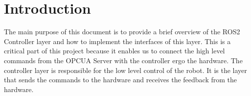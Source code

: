 \section{Introduction}

The main purpose of this document is to provide a brief overview of the ROS2 Controller layer and how to implement the interfaces of this layer.
This is a critical part of this project because it enables us to connect the high level commands from the OPCUA Server with the controller ergo the 
hardware. The controller layer is responsible for the low level control of the robot. It is the layer that sends the commands to the hardware and receives the feedback from the hardware.

